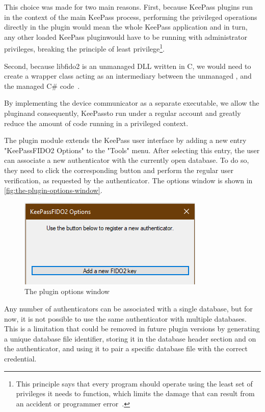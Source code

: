 This choice was made for two main reasons. First, because KeePass plugins run in the context of the main KeePass process,
performing the privileged operations directly in the plugin would mean the whole KeePass application
\textemdash and in turn, any other loaded KeePass plugin\textemdash would have to be running with
administrator privileges, breaking the principle of least privilege\footnote{
	This principle says that every program should operate using the least set of privileges it needs to function,
	which limits the damage that can result from an accident or programmer error~\cite{the-protection-of-information}.
}.

Second, because libfido2 is an unmanaged DLL written in C, we would need to create a wrapper class acting as an
intermediary between the unmanaged , and the managed C\# code~\cite{microsoft:unmanaged-dll}.

By implementing the device communicator as a separate executable, we allow the plugin\textemdash and consequently,
KeePass\textemdash to run under a regular account and greatly reduce the amount of code running in a privileged context.

The plugin module extends the KeePass user interface by adding a new entry "KeePassFIDO2 Options" to the "Tools" menu. After selecting this entry,
the user can associate a new authenticator with the currently open database. To do so, they need to click the corresponding button
and perform the regular user verification, as requested by the authenticator. The options window is shown in \autoref{fig:the-plugin-options-window}.

\begin{figure}[H]
	\centering\includegraphics[width=.75\textwidth]{images/plugin-options}
	\caption{The plugin options window}
	\label{fig:the-plugin-options-window}
\end{figure}

Any number of authenticators can be associated with a single database, but for now, it is not possible
to use the same authenticator with multiple databases. This is a limitation that could be removed in future
plugin versions by generating a unique database file identifier, storing it in the database header section
and on the authenticator, and using it to pair a specific database file with the correct credential.

